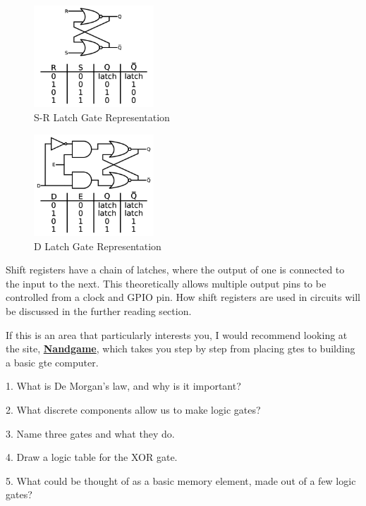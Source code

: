 \documentclass[a4paper,11pt]{report}
\newcommand{\Quiz}[1] %
{
\par\noindent %
\phantomsection %
\todo[inline, color=blue!30]{\textbf{#1}} %
\vspace{1em} %
}
\let\oldhref\href %
\renewcommand{\href}[2]{\oldhref{#1}{\bfseries#2}}
\begin{document}
\begin{figure}[H]
\centering
\includegraphics[width=0.4\textwidth]{srlatch}
\caption{S-R Latch Gate Representation}
\end{figure}

\begin{figure}[H]
\centering
\includegraphics[width=0.4\textwidth]{dlatch}
\caption{D Latch Gate Representation}
\end{figure}

Shift registers have a chain of latches, where the output of one is connected to the input to the next. This theoretically allows multiple output pins to be controlled from a clock and GPIO pin. How shift registers are used in circuits will be discussed in the further reading section.

If this is an area that particularly interests you, I would recommend looking at the site, \href{https://nandgame.com/}{Nandgame}, which takes you step by step from placing \gls{gte}s to building a basic \gls{gte} computer.

\Quiz{Quiz}

1. What is De Morgan's law, and why is it important?

2. What discrete components allow us to make logic gates?

3. Name three gates and what they do.

4. Draw a logic table for the XOR gate.

5. What could be thought of as a basic memory element, made out of a few logic gates?

\pagebreak
\end{document}
